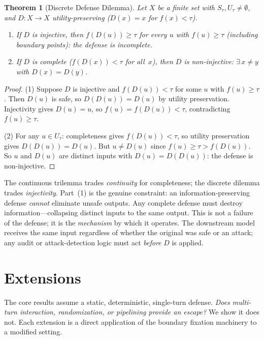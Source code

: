 \documentclass[11pt]{article}
\newtheorem{theorem}{Theorem}[section]
\begin{document}
\begin{theorem}[Discrete Defense Dilemma]
\label{thm:disc-dilemma}
Let $X$ be a finite set with $S_\tau, U_\tau \neq \emptyset$, and
$D\colon X \to X$ utility-preserving ($D(x) = x$ for $f(x) < \tau$).
\begin{enumerate}[nosep]
  \item If $D$ is injective, then $f(D(u)) \geq \tau$ for every
    $u$ with $f(u) \geq \tau$ (including boundary points): the
    defense is incomplete.
  \item If $D$ is complete ($f(D(x)) < \tau$ for all~$x$), then $D$ is
    non-injective: $\exists\, x \neq y$ with $D(x) = D(y)$.
\end{enumerate}
\end{theorem}

\begin{proof}
(1) Suppose $D$ is injective and $f(D(u)) < \tau$ for some $u$ with
$f(u) \geq \tau$. Then $D(u)$ is safe, so $D(D(u)) = D(u)$ by utility
preservation. Injectivity gives $D(u) = u$, so
$f(u) = f(D(u)) < \tau$, contradicting $f(u) \geq \tau$.

(2) For any $u \in U_\tau$: completeness gives $f(D(u)) < \tau$, so
utility preservation gives $D(D(u)) = D(u)$. But
$u \neq D(u)$ since $f(u) \geq \tau > f(D(u))$.
So $u$ and $D(u)$ are distinct inputs with $D(u) = D(D(u))$: the
defense is non-injective.
\end{proof}

The continuous trilemma trades \emph{continuity} for completeness;
the discrete dilemma trades \emph{injectivity}. Part~(1) is the
genuine constraint: an information-preserving defense \emph{cannot}
eliminate unsafe outputs. Any complete defense must destroy
information---collapsing distinct inputs to the same output. This is
not a failure of the defense; it is the \emph{mechanism} by which it
operates. The downstream model receives the same input regardless
of whether the original was safe or an attack; any audit or
attack-detection logic must act \emph{before} $D$ is applied.


\section{Extensions}
\label{sec:extensions}

The core results assume a static, deterministic, single-turn defense. \emph{Does multi-turn interaction, randomization,
or pipelining provide an escape?} We show it does not. Each extension
is a direct application of the boundary fixation machinery to a
modified setting.
\end{document}
